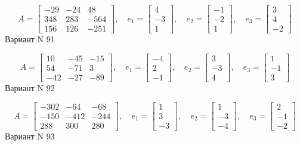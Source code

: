 \documentclass[11pt]{report}
\begin{document}
$$A = \left[\begin{matrix}-29 & -24 & 48\\348 & 283 & -564\\156 & 126 & -251\end{matrix}\right],\quad e_1 = \left[\begin{matrix}4\\-3\\1\end{matrix}\right],\quad e_2 = \left[\begin{matrix}-1\\-2\\1\end{matrix}\right],\quad e_3 = \left[\begin{matrix}3\\4\\-2\end{matrix}\right]$$Вариант N 91

$$A = \left[\begin{matrix}10 & -45 & -15\\54 & -71 & 3\\-42 & -27 & -89\end{matrix}\right],\quad e_1 = \left[\begin{matrix}-4\\2\\-1\end{matrix}\right],\quad e_2 = \left[\begin{matrix}3\\-3\\4\end{matrix}\right],\quad e_3 = \left[\begin{matrix}1\\-1\\3\end{matrix}\right]$$Вариант N 92

$$A = \left[\begin{matrix}-302 & -64 & -68\\-150 & -412 & -244\\288 & 300 & 280\end{matrix}\right],\quad e_1 = \left[\begin{matrix}1\\3\\-3\end{matrix}\right],\quad e_2 = \left[\begin{matrix}1\\-3\\-4\end{matrix}\right],\quad e_3 = \left[\begin{matrix}2\\-1\\-2\end{matrix}\right]$$Вариант N 93
\end{document}
